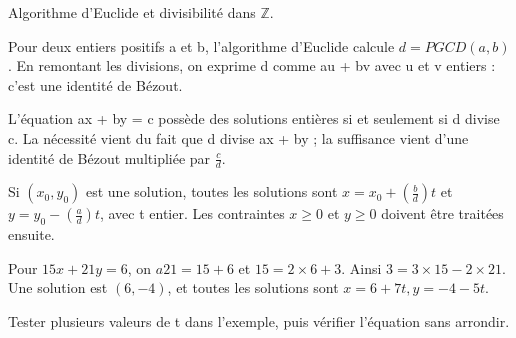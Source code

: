 \documentclass[11pt]{article}
\begin{document}
Algorithme d’Euclide et divisibilité dans \(\mathbb{Z}\).\par
{}
Pour deux entiers positifs a et b, l’algorithme d’Euclide calcule \(d = PGCD(a,b)\). En remontant les divisions, on exprime d comme au + bv avec u et v entiers : c’est une identité de Bézout.\par
L’équation ax + by = c possède des solutions entières si et seulement si d divise c. La nécessité vient du fait que d divise ax + by ; la suffisance vient d’une identité de Bézout multipliée par \(\frac{c}{d}\).\par
Si \((x_{0},y_{0})\) est une solution, toutes les solutions sont \(x = x_{0} + (\frac{b}{d})t\) et \(y = y_{0} - (\frac{a}{d})t\), avec t entier. Les contraintes \(x \geq  0\) et \(y \geq  0\) doivent être traitées ensuite.\par
{}
Pour \(15x + 21y = 6\), on \(a 21 = 15 + 6\) et \(15 = 2 \times  6 + 3\). Ainsi \(3 = 3 \times  15 - 2 \times  21\). Une solution est \((6,-4)\), et toutes les solutions sont \(x = 6 + 7t, y = -4 - 5t\).\par
{}
Tester plusieurs valeurs de t dans l’exemple, puis vérifier l’équation sans arrondir.\par
\end{document}
